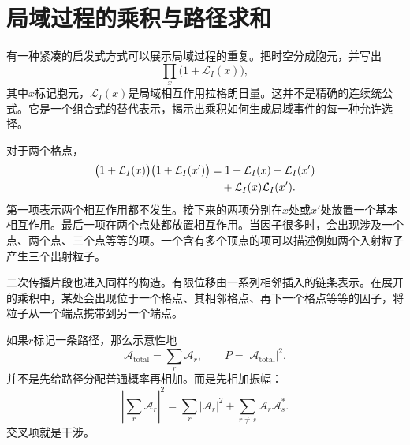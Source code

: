\section{局域过程的乘积与路径求和}

有一种紧凑的启发式方式可以展示局域过程的重复。把时空分成胞元，并写出
\begin{equation}
\prod_x\bigl(1+\mathcal L_I(x)\bigr),
\end{equation}
其中\(x\)标记胞元，\(\mathcal L_I(x)\)是局域相互作用拉格朗日量。这并不是精确的连续统公式。它是一个组合式的替代表示，揭示出乘积如何生成局域事件的每一种允许选择。

\begin{classroomqa}
\end{classroomqa}

对于两个格点，
\begin{align}
\bigl(1+\mathcal L_I(x)\bigr)
\bigl(1+\mathcal L_I(x')\bigr)
&=
1+\mathcal L_I(x)+\mathcal L_I(x')
\notag\\
&\quad{}+\mathcal L_I(x)\mathcal L_I(x').
\end{align}
第一项表示两个相互作用都不发生。接下来的两项分别在\(x\)处或\(x'\)处放置一个基本相互作用。最后一项在两个点处都放置相互作用。当因子很多时，会出现涉及一个点、两个点、三个点等等的项。一个含有多个顶点的项可以描述例如两个入射粒子产生三个出射粒子。

二次传播片段也进入同样的构造。有限位移由一系列相邻插入的链条表示。在展开的乘积中，某处会出现位于一个格点、其相邻格点、再下一个格点等等的因子，将粒子从一个端点携带到另一个端点。

\begin{classroomqa}
\end{classroomqa}

如果\(r\)标记一条路径，那么示意性地
\begin{equation}
\mathcal A_{\mathrm{total}}=\sum_r\mathcal A_r,
\qquad
P=\left|\mathcal A_{\mathrm{total}}\right|^2.
\end{equation}
并不是先给路径分配普通概率再相加。而是先相加振幅：
\begin{equation}
\left|\sum_r\mathcal A_r\right|^2
=
\sum_r|\mathcal A_r|^2
+
\sum_{r\ne s}\mathcal A_r\mathcal A_s^*.
\end{equation}
交叉项就是干涉。


